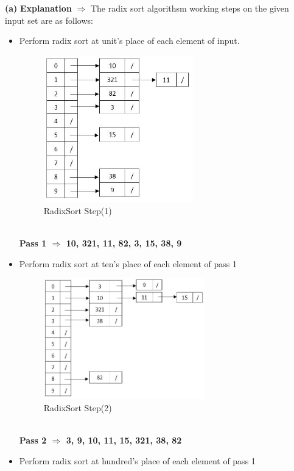 \documentclass[11pt]{article}
\renewcommand\part[1]{\vspace{.10in}\textbf{(#1)}}
\begin{document}
\part{a} \textbf{Explanation} $\Rightarrow$ The radix sort algorithsm working steps on the given input set are as follows:
\begin{itemize}
	\item Perform radix sort at unit's place of each element of input. \newline 
		\begin{figure}[h]
			\centering
			\includegraphics[width=65mm]{radixsort01.JPG}
			\caption{RadixSort Step(1) \label{overflow}}
		\end{figure}
		\\
		\textbf{Pass 1 $\Rightarrow$ 10, 321, 11, 82, 3, 15, 38, 9}
	\item Perform radix sort at ten's place of each element of pass 1
		\begin{figure}[h]
			\centering
			\includegraphics[width=70mm]{radixsort02.JPG}
			\caption{RadixSort Step(2) \label{overflow}}
		\end{figure}	
		\\
		\textbf{Pass 2 $\Rightarrow$ 3, 9, 10, 11, 15, 321, 38, 82}
	\item Perform radix sort at hundred's place of each element of pass 1
		\begin{figure}[h]
			\centering

\end{figure}
\end{itemize}
\end{document}
